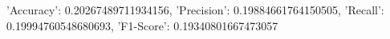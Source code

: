 {'Accuracy': 0.20267489711934156, 'Precision': 0.19884661764150505, 'Recall': 0.19994760548680693, 'F1-Score': 0.19340801667473057}
